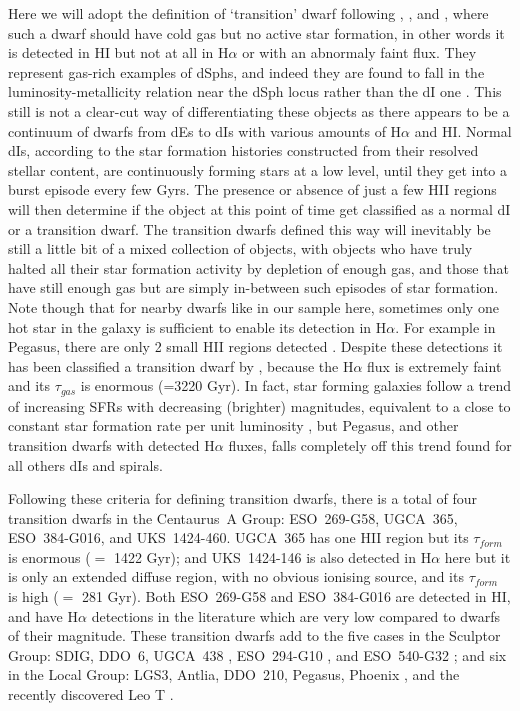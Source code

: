 \documentclass[preprint]{aastex}
\begin{document}
Here we will adopt the definition of `transition' dwarf following \citet{m98},
\citet{scm03a}, and \citet{ggh03}, where such a dwarf should have cold gas but no
active star formation, in other words it is detected in HI but not at all 
in H$\alpha $ or with an abnormaly faint flux. 
They represent gas-rich examples of dSphs, and indeed they are found
to fall in the luminosity-metallicity relation near the dSph locus rather 
than the dI one \citep{m98}.  This still is not a
clear-cut way of differentiating these objects as there appears to be 
a continuum of dwarfs from dEs to dIs with various amounts of H$\alpha$ and HI.
Normal dIs, according to the star formation histories constructed from       
their resolved stellar content, are continuously forming stars at a low
level, until they get into a burst episode every few
Gyrs. The presence or absence of just a few HII regions will then determine if
the object at this point of time get classified as a normal dI or a
transition dwarf. The transition dwarfs defined this way will inevitably 
be still a little bit of a mixed collection of objects, with objects who have truly
halted all their star formation activity by depletion of enough gas, and 
those that have still enough gas but are simply in-between such episodes of star
formation. Note though that for nearby dwarfs like in our sample here,
sometimes only one hot star in the galaxy is sufficient to enable its 
detection in H$\alpha$. For example in Pegasus, there are only 2 small HII 
regions detected \citep{sbk97}.  Despite these  
detections it has been classified a transition dwarf by \citep{m98}, because 
the H$\alpha$ flux is extremely faint and its $\tau _{gas}$ is enormous 
(=3220 Gyr). In fact, star forming galaxies follow a trend of increasing
SFRs with decreasing (brighter) magnitudes, equivalent
to a close to constant star formation rate per unit luminosity 
\citep[see Figure 2 of][]{kk07}, but Pegasus, and other transition dwarfs with
detected H$\alpha$ fluxes, falls completely off
this trend found for all others dIs and spirals.

Following these criteria for defining transition dwarfs, there is a total 
of four transition dwarfs in the Centaurus~A Group: ESO~269-G58, UGCA~365, 
ESO~384-G016, and UKS~1424-460.
UGCA~365 has one HII region but its $\tau _{form}$
is enormous ($=$ 1422 Gyr); and UKS~1424-146 is also detected in H$\alpha $ here but
it is only an extended diffuse region, with no obvious ionising source, and
its $\tau _{form}$ is high ($=$ 281 Gyr). Both ESO~269-G58 and ESO~384-G016 are detected
in HI, and have H$\alpha $ detections in the literature which are very low compared
to dwarfs of their magnitude. 
These transition dwarfs add to the five cases in the Sculptor 
Group: SDIG, DDO~6, UGCA~438 \citep[see][]{scm03a}, ESO~294-G10 \citep{jfb98,bou09},
 and ESO~540-G32 \citep{djb08}; 
and six 
in the Local Group: LGS3, Antlia, DDO~210, Pegasus, Phoenix \citep{m98},
 and the recently discovered Leo T \citep{ibe07}. 
\end{document}
